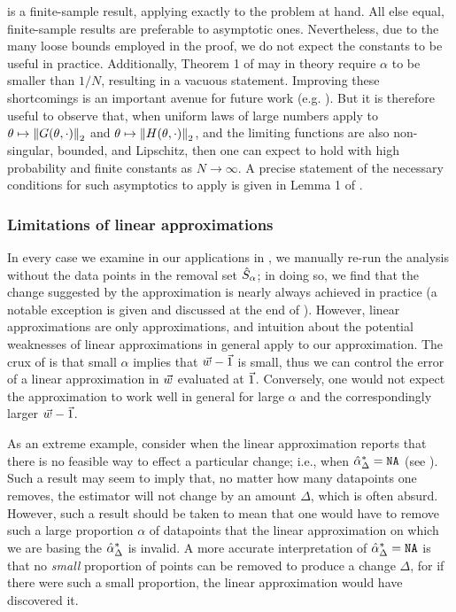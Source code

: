  is a finite-sample result, applying exactly to the
problem at hand.  All else equal, finite-sample results are preferable to
asymptotic ones. Nevertheless, due to the many loose bounds employed in the
proof, we do not expect the constants to be useful in practice. Additionally,
Theorem 1 of \citet{giordano:2019:swiss} may in theory require $\alpha$ to be
smaller than $1 / N$, resulting in a vacuous statement. Improving these
shortcomings is an important avenue for future work (e.g.
\citet{giordano2019higherorder, wilson:2020:approximate}).  But it is therefore
useful to observe that, when uniform laws of large numbers apply to $\theta
\mapsto \left\Vert G(\theta, \cdot)\right\Vert_2$ and $\theta \mapsto \left\Vert H(\theta,
\cdot)\right\Vert_2$, and the limiting functions are also non-singular, bounded, and
Lipschitz, then one can expect  to hold with high probability
and finite constants as $N \rightarrow \infty$. A precise statement of the
necessary conditions for such asymptotics to apply is given in Lemma 1 of
\citet{giordano:2019:swiss}.

\subsubsection{Limitations of linear approximations}

In every case we examine in our applications in , we manually
re-run the analysis without the data points in the removal set $\hat{S}_{\alpha}$;
in doing so, we find that the change suggested by the approximation is  nearly
always achieved in practice (a notable exception is given and discussed at the
end of ).  However, linear
approximations are only approximations, and intuition about the potential
weaknesses of linear approximations in general apply to our approximation.  The
crux of  is that small $\alpha$ implies that $\vec{w} -
\vec{1}$ is small, thus we can control the error of a linear approximation in
$\vec{w}$ evaluated at $\vec{1}$.  Conversely, one would not expect the approximation
to work well in general for large $\alpha$ and the correspondingly larger $\vec{w} -
\vec{1}$.

As an extreme example, consider when the linear approximation reports that there
is no feasible way to effect a particular change; i.e., when $\hat{\alpha}^*_{\Delta} =
\texttt{NA}$ (see ).  Such a result may seem to imply that, no
matter how many datapoints one removes, the estimator will not change by an
amount $\Delta$, which is often absurd. However, such a result should be taken
to mean that one would have to remove such a large proportion $\alpha$ of
datapoints that the linear approximation on which we are basing the
$\hat{\alpha}^*_{\Delta}$ is invalid.  A more accurate interpretation of
$\hat{\alpha}^*_{\Delta} = \texttt{NA}$ is that no {\em small} proportion of points can be
removed to produce a change $\Delta$, for if there were such a small proportion,
the linear approximation would have discovered it.

